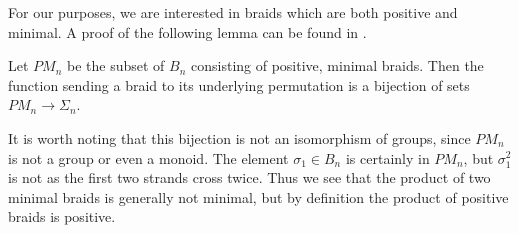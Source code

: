 \documentclass{amsbook} %
\numberwithin{section}{chapter}
\begin{document}
For our purposes, we are interested in braids which are both positive and minimal.  A proof of the following lemma can be found in \cite{EM2}.

\begin{lem}\label{pmlem}
Let $PM_{n}$ be the subset of $B_{n}$ consisting of positive, minimal braids.  Then the function sending a braid to its underlying permutation is a bijection of sets $PM_{n} \rightarrow \Sigma_{n}$.
\end{lem}

\begin{rem}\label{pmrem}
It is worth noting that this bijection is not an isomorphism of groups, since $PM_{n}$ is not a group or even a monoid.  The element $\sigma_{1} \in B_{n}$ is certainly in $PM_{n}$, but $\sigma_{1}^{2}$ is not as the first two strands cross twice.  Thus we see that the product of two minimal braids is generally not minimal, but by definition the product of positive braids is positive.
\end{rem}
\end{document}
